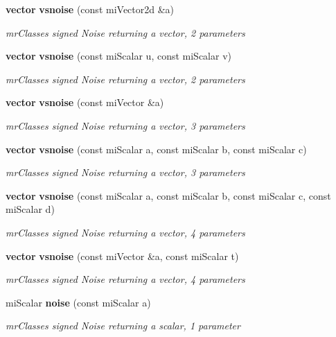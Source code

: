 \begin{CompactItemize}
{\bf vector} {\bf vsnoise} (const mi\-Vector2d \&a)
\begin{CompactList}\small\item\em mr\-Classes signed Noise returning a vector, 2 parameters \item\end{CompactList}\item 
{\bf vector} {\bf vsnoise} (const mi\-Scalar u, const mi\-Scalar v)
\begin{CompactList}\small\item\em mr\-Classes signed Noise returning a vector, 2 parameters \item\end{CompactList}\item 
{\bf vector} {\bf vsnoise} (const mi\-Vector \&a)
\begin{CompactList}\small\item\em mr\-Classes signed Noise returning a vector, 3 parameters \item\end{CompactList}\item 
{\bf vector} {\bf vsnoise} (const mi\-Scalar a, const mi\-Scalar b, const mi\-Scalar c)
\begin{CompactList}\small\item\em mr\-Classes signed Noise returning a vector, 3 parameters \item\end{CompactList}\item 
{\bf vector} {\bf vsnoise} (const mi\-Scalar a, const mi\-Scalar b, const mi\-Scalar c, const mi\-Scalar d)
\begin{CompactList}\small\item\em mr\-Classes signed Noise returning a vector, 4 parameters \item\end{CompactList}\item 
{\bf vector} {\bf vsnoise} (const mi\-Vector \&a, const mi\-Scalar t)
\begin{CompactList}\small\item\em mr\-Classes signed Noise returning a vector, 4 parameters \item\end{CompactList}\item 
mi\-Scalar {\bf noise} (const mi\-Scalar a)
\begin{CompactList}\small\item\em mr\-Classes signed Noise returning a scalar, 1 parameter \item\end{CompactList}\item 

\end{CompactItemize}
